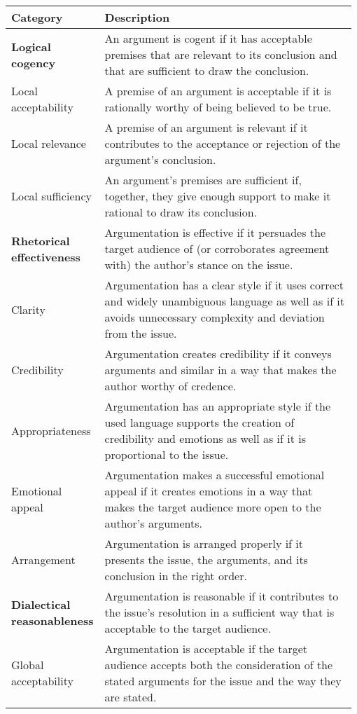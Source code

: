 \begin{table*}[ht]
\small\renewcommand{\arraystretch}{1.15}
\setlength{\tabcolsep}{2.5pt}
\centering
\begin{tabular*}{\linewidth}{p{0.20\linewidth}p{0.78\linewidth}}
\toprule 
\textbf{Category} & \textbf{Description}\\
\midrule
\bf Logical cogency & An argument is cogent if it has acceptable premises that are relevant to its conclusion and that are sufficient to draw the conclusion.\\
Local acceptability&A premise of an argument is acceptable if it is rationally worthy of being believed to be true.\\
Local relevance&A premise of an argument is relevant if it contributes to the acceptance or rejection of the argument's conclusion.\\
Local sufficiency&An argument's premises are sufficient if, together, they give enough support to make it rational to draw its conclusion.\\
\midrule
\bf Rhetorical effectiveness &Argumentation is effective if it persuades the target audience of (or corroborates agreement with) the author’s stance on the issue.\\
Clarity&Argumentation has a clear style if it uses correct and widely unambiguous language as well as if it avoids unnecessary complexity and deviation from the issue.\\
Credibility&Argumentation creates credibility if it conveys arguments and similar in a way that makes the author worthy of credence.\\
Appropriateness&Argumentation has an appropriate style if the used language supports the creation of credibility and emotions as well as if it is proportional to the issue.\\
Emotional appeal&Argumentation makes a successful emotional appeal if it creates emotions in a way that makes the target audience more open to the author’s arguments.\\
Arrangement&Argumentation is arranged properly if it presents the issue, the arguments, and its conclusion in the right order.\\
\midrule
\bf Dialectical reasonableness&Argumentation is reasonable if it contributes to the issue’s resolution in a sufficient way that is acceptable to the target audience.\\
 Global acceptability&Argumentation is acceptable if the target audience accepts both the consideration of the stated arguments for the issue and the way they are stated.\\

\end{tabular*}
\end{table*}
